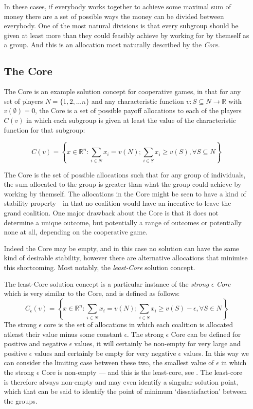 In these cases, if everybody works together to achieve some maximal sum of money there are a set of possible ways the money can be divided between everybody.
One of the most natural divisions is that every subgroup should be given at least more than they could feasibly achieve by working for by themself as a group.
And this is an allocation most naturally described by the \textit{Core}.

\subsection{The Core}

The Core is an example solution concept for cooperative games, in that for any set of players $N=\{1,2,\dots n\}$ and any characteristic function $v: S\subseteq N \rightarrow \mathbb{R}$ with $v(\emptyset)=0$, the Core is a set of possible payoff allocations to each of the players $C(v)$ in which each subgroup is given at least the value of the characteristic function for that subgroup:

$$ C(v) = \left\{x\in\mathbb{R}^n : \sum_{i\in N}x_i=v(N); \sum_{i\in S}x_i \ge v(S), \forall S\subseteq N \right\}$$

The Core is the set of possible allocations such that for any group of individuals, the sum allocated to the group is greater than what the group could achieve by working by themself.
The allocations in the Core might be seen to have a kind of stability property - in that no coalition would have an incentive to leave the grand coalition. One major drawback about the Core is that it does not determine a unique outcome, but potentially a range of outcomes or potentially none at all, depending on the cooperative game.

Indeed the Core may be empty, and in this case no solution can have the same kind of desirable stability, however there are alternative allocations that minimise this shortcoming.
Most notably, the \textit{least-Core} solution concept.

The least-Core solution concept is a particular instance of the \textit{strong $\epsilon$ Core} which is very similar to the Core, and is defined as follows:
$$ C_\epsilon(v) = \left\{x\in\mathbb{R}^n : \sum_{i\in N}x_i=v(N); \sum_{i\in S}x_i \ge v(S)-\epsilon, \forall S\in N \right\}$$
The strong $\epsilon$ core is the set of allocations in which each coalition is allocated atleast their value minus some constant $\epsilon$.
The strong $\epsilon$ Core can be defined for positive and negative $\epsilon$ values, it will certainly be non-empty for very large and positive $\epsilon$ values and certainly be empty for very negative $\epsilon$ values.
In this way we can consider the limiting case between these two, the smallest value of $\epsilon$ in which the strong $\epsilon$ Core is non-empty --- and this is the least-core, see \cite{doi:10.1287/moor.4.4.303}.
The least-core is therefore always non-empty and may even identify a singular solution point, which that can be said to identify the point of minimum `dissatisfaction' between the groups.

